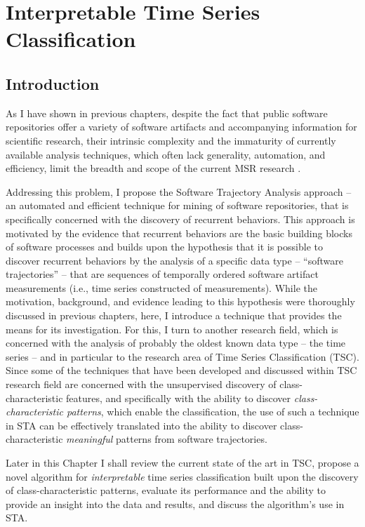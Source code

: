 \chapter{Interpretable Time Series Classification}\label{chapter_sax_vsm}

\section{Introduction}
As I have shown in previous chapters, despite the fact that public software repositories offer a variety of software 
artifacts and accompanying information for scientific research, their intrinsic complexity and the immaturity of 
currently available analysis techniques, which often lack generality, automation, and efficiency, limit the breadth 
and scope of the current MSR research \cite{citeulike:7853299} \cite{citeulike:12550438}.

Addressing this problem, I propose the Software Trajectory Analysis approach -- an automated and efficient technique
for mining of software repositories, that is specifically concerned with the discovery of recurrent behaviors.
This approach is motivated by the evidence that recurrent behaviors are the basic building blocks of software 
processes \cite{neal2012habits} \cite{1903} \cite{citeulike:13208461} and builds upon the hypothesis that it is 
possible to discover recurrent behaviors by the analysis of a specific data type -- ``software trajectories'' -- 
that are sequences of temporally ordered software artifact measurements (i.e., time series constructed of measurements).
While the motivation, background, and evidence leading to this hypothesis were thoroughly discussed in 
previous chapters, here, I introduce a technique that provides the means for its investigation. 
For this, I turn to another research field, which is concerned with the analysis of probably the oldest known 
data type -- the time series \cite{citeulike:1454223} -- and in particular to the research area of 
Time Series Classification (TSC). Since some of the techniques that have been developed and discussed 
within TSC research field are concerned with the unsupervised discovery of class-characteristic features, 
and specifically with the ability to discover \textit{class-characteristic patterns}, which enable the classification, 
the use of such a technique in STA can be effectively translated into the ability to discover class-characteristic 
\textit{meaningful} patterns from software trajectories. 

Later in this Chapter I shall review the current state of the art in TSC, 
propose a novel algorithm for \textit{interpretable} time series classification built upon the discovery of 
class-characteristic patterns, evaluate its performance and the ability to provide an insight into the data and results, 
and discuss the algorithm's use in STA.

